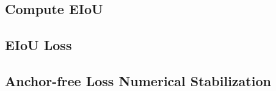\chapter{}

\section{Compute EIoU}

\section{EIoU Loss}

\section{Anchor-free Loss Numerical Stabilization}
\label{appendix:numerical-stabilization}

